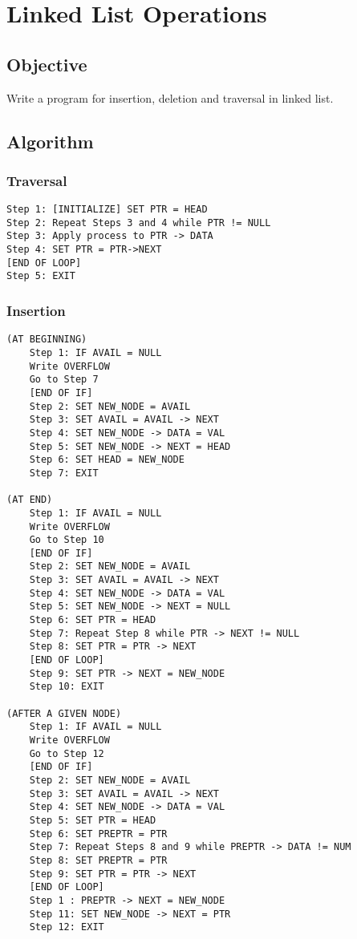 \section{Linked List Operations}
\label{sec:Linked List Operations}

\subsection{Objective}
Write a program for insertion, deletion and traversal in linked list.
\subsection{Algorithm}

\subsubsection{Traversal}
\begin{lstlisting}[style=mystyle]
Step 1: [INITIALIZE] SET PTR = HEAD
Step 2: Repeat Steps 3 and 4 while PTR != NULL
Step 3: Apply process to PTR -> DATA
Step 4: SET PTR = PTR->NEXT
[END OF LOOP]
Step 5: EXIT
\end{lstlisting}

\subsubsection{Insertion}
\begin{lstlisting}[style=mystyle]
(AT BEGINNING)
    Step 1: IF AVAIL = NULL
    Write OVERFLOW
    Go to Step 7
    [END OF IF]
    Step 2: SET NEW_NODE = AVAIL
    Step 3: SET AVAIL = AVAIL -> NEXT
    Step 4: SET NEW_NODE -> DATA = VAL
    Step 5: SET NEW_NODE -> NEXT = HEAD
    Step 6: SET HEAD = NEW_NODE
    Step 7: EXIT

(AT END)
    Step 1: IF AVAIL = NULL
    Write OVERFLOW
    Go to Step 10
    [END OF IF]
    Step 2: SET NEW_NODE = AVAIL
    Step 3: SET AVAIL = AVAIL -> NEXT
    Step 4: SET NEW_NODE -> DATA = VAL
    Step 5: SET NEW_NODE -> NEXT = NULL
    Step 6: SET PTR = HEAD
    Step 7: Repeat Step 8 while PTR -> NEXT != NULL
    Step 8: SET PTR = PTR -> NEXT
    [END OF LOOP]
    Step 9: SET PTR -> NEXT = NEW_NODE
    Step 10: EXIT

(AFTER A GIVEN NODE)
    Step 1: IF AVAIL = NULL
    Write OVERFLOW
    Go to Step 12
    [END OF IF]
    Step 2: SET NEW_NODE = AVAIL
    Step 3: SET AVAIL = AVAIL -> NEXT
    Step 4: SET NEW_NODE -> DATA = VAL
    Step 5: SET PTR = HEAD
    Step 6: SET PREPTR = PTR
    Step 7: Repeat Steps 8 and 9 while PREPTR -> DATA != NUM
    Step 8: SET PREPTR = PTR
    Step 9: SET PTR = PTR -> NEXT
    [END OF LOOP]
    Step 1 : PREPTR -> NEXT = NEW_NODE
    Step 11: SET NEW_NODE -> NEXT = PTR
    Step 12: EXIT
\end{lstlisting}

